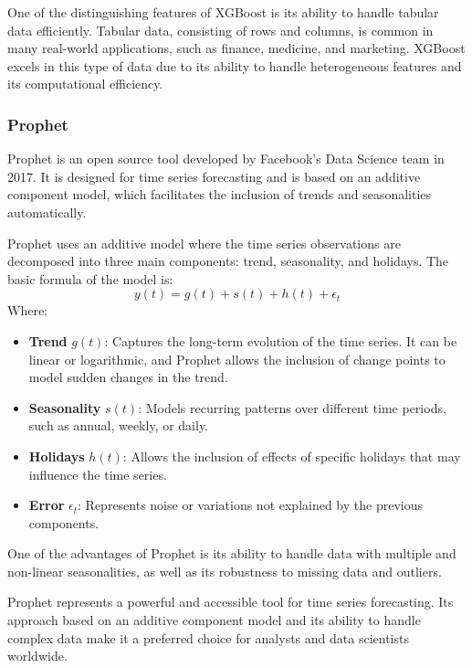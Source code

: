 One of the distinguishing features of XGBoost is its ability to handle tabular data efficiently. Tabular data, consisting of rows and columns, is common in many real-world applications, such as finance, medicine, and marketing. XGBoost excels in this type of data due to its ability to handle heterogeneous features and its computational efficiency.
\vspace{10pt}

\subsubsection{Prophet}
Prophet\cite{prophet} is an open source tool developed by Facebook's Data Science team in 2017. It is designed for time series forecasting and is based on an additive component model, which facilitates the inclusion of trends and seasonalities automatically.

Prophet uses an additive model where the time series observations are decomposed into three main components: trend, seasonality, and holidays. The basic formula of the model is:
\begin{equation}
y(t) = g(t) + s(t) + h(t) + \epsilon_t
\end{equation}
Where:
\begin{itemize}
    \item \textbf{Trend} \(g(t)\): Captures the long-term evolution of the time series. It can be linear or logarithmic, and Prophet allows the inclusion of change points to model sudden changes in the trend.
    \item \textbf{Seasonality} \(s(t)\): Models recurring patterns over different time periods, such as annual, weekly, or daily.
    \item \textbf{Holidays} \(h(t)\): Allows the inclusion of effects of specific holidays that may influence the time series.
    \item \textbf{Error} \(\epsilon_t\): Represents noise or variations not explained by the previous components.
\end{itemize}

One of the advantages of Prophet is its ability to handle data with multiple and non-linear seasonalities, as well as its robustness to missing data and outliers.

Prophet represents a powerful and accessible tool for time series forecasting. Its approach based on an additive component model and its ability to handle complex data make it a preferred choice for analysts and data scientists worldwide.
\vspace{10pt}


